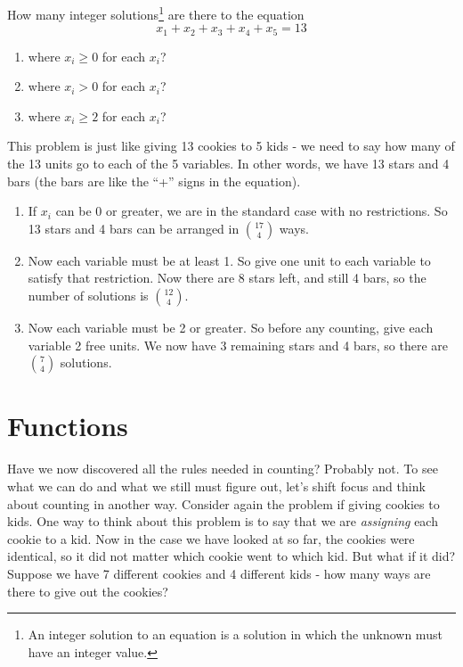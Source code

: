 \documentclass[12pt]{article}
\begin{document}
\begin{example}
  How many integer solutions\footnote{An integer solution to an equation is a solution in which the unknown must have an integer value.} are there to the equation
  \[x_1 + x_2 + x_3 + x_4 + x_5 = 13\]
  \begin{enumerate}
    \item where $x_i \ge 0$ for each $x_i$?
    \item where $x_i > 0$ for each $x_i$?
    \item where $x_i \ge 2$ for each $x_i$?

  \end{enumerate}
  \begin{solution}
  This problem is just like giving 13 cookies to 5 kids - we need to say how many of the 13 units go to each of the 5 variables.  In other words, we have 13 stars and 4 bars (the bars are like the ``+'' signs in the equation).
      \begin{enumerate}
    \item If $x_i$ can be 0 or greater, we are in the standard case with no restrictions.  So 13 stars and 4 bars can be arranged in ${17 \choose 4}$ ways.
    \item Now each variable must be at least 1.  So give one unit to each variable to satisfy that restriction.  Now there are 8 stars left, and still 4 bars, so the number of solutions is ${12 \choose 4}$.
    \item Now each variable must be 2 or greater.  So before any counting, give each variable 2 free units.  We now have 3 remaining stars and 4 bars, so there are ${7 \choose 4}$ solutions.
      
  \end{enumerate}
  \end{solution}

\end{example}


\section{Functions}

Have we now discovered all the rules needed in counting?  Probably not.  To see what we can do and what we still must figure out, let's shift focus and think about counting in another way.  Consider again the problem if giving cookies to kids.  One way to think about this problem is to say that we are {\em assigning} each cookie to a kid.  Now in the case we have looked at so far, the cookies were identical, so it did not matter which cookie went to which kid.  But what if it did?  Suppose we have 7 different cookies and 4 different kids - how many ways are there to give out the cookies?
\end{document}
